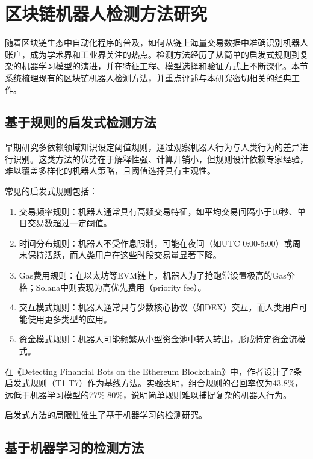 \section{区块链机器人检测方法研究}

\par 随着区块链生态中自动化程序的普及，如何从链上海量交易数据中准确识别机器人账户，成为学术界和工业界关注的热点。检测方法经历了从简单的启发式规则到复杂的机器学习模型的演进，并在特征工程、模型选择和验证方式上不断深化。本节系统梳理现有的区块链机器人检测方法，并重点评述与本研究密切相关的经典工作。

\subsection{基于规则的启发式检测方法}

\par 早期研究多依赖领域知识设定阈值规则，通过观察机器人行为与人类行为的差异进行识别。这类方法的优势在于解释性强、计算开销小，但规则设计依赖专家经验，难以覆盖多样化的机器人策略，且阈值选择具有主观性。
\par 常见的启发式规则包括：
\begin{enumerate}
    \item 交易频率规则：机器人通常具有高频交易特征，如平均交易间隔小于10秒、单日交易数超过一定阈值。 
    \item 时间分布规则：机器人不受作息限制，可能在夜间（如UTC 0:00-5:00）或周末保持活跃，而人类用户在这些时段交易量显著下降。
    \item Gas费用规则：在以太坊等EVM链上，机器人为了抢跑常设置极高的Gas价格；Solana中则表现为高优先费用（priority fee）。
    \item 交互模式规则：机器人通常只与少数核心协议（如DEX）交互，而人类用户可能使用更多类型的应用。
    \item 资金模式规则：机器人可能频繁从小型资金池中转入转出，形成特定资金流模式。
\end{enumerate}
\par 在《Detecting Financial Bots on the Ethereum Blockchain》中，作者设计了7条启发式规则（T1-T7）作为基线方法。实验表明，组合规则的召回率仅为43.8\%，远低于机器学习模型的77\%-80\%，说明简单规则难以捕捉复杂的机器人行为。
\par 启发式方法的局限性催生了基于机器学习的检测研究。

\subsection{基于机器学习的检测方法}

